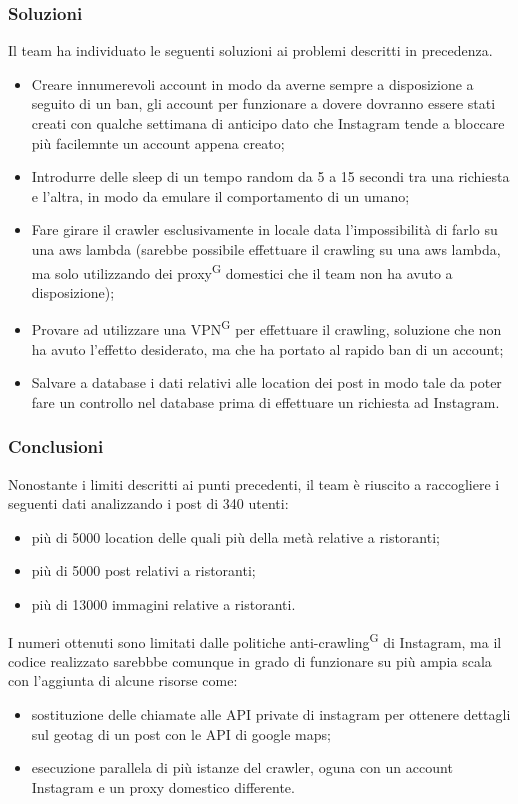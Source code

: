 \subsubsection{Soluzioni}
Il team ha individuato le seguenti soluzioni ai problemi descritti in precedenza.
\begin{itemize}
    \item Creare innumerevoli account in modo da averne sempre a disposizione a seguito di un ban, gli account per funzionare a dovere dovranno essere stati creati con qualche settimana di anticipo dato che Instagram tende a bloccare più facilemnte un account appena creato;
    \item Introdurre delle sleep di un tempo random da 5 a 15 secondi tra una richiesta e l'altra, in modo da emulare il comportamento di un umano;
    \item Fare girare il crawler esclusivamente in locale data l'impossibilità di farlo su una aws lambda (sarebbe possibile effettuare il crawling su una aws lambda, ma solo utilizzando dei proxy\textsuperscript{G} domestici che il team non ha avuto a disposizione);
    \item Provare ad utilizzare una VPN\textsuperscript{G} per effettuare il crawling, soluzione che non ha avuto l'effetto desiderato, ma che ha portato al rapido ban di un account;
    \item Salvare a database i dati relativi alle location dei post in modo tale da poter fare un controllo nel database prima di effettuare un richiesta ad Instagram.
\end{itemize}

\subsubsection{Conclusioni}
Nonostante i limiti descritti ai punti precedenti, il team è riuscito a raccogliere i seguenti dati analizzando i post di 340 utenti:
\begin{itemize}
    \item più di 5000 location delle quali più della metà relative a ristoranti;
    \item più di 5000 post relativi a ristoranti;
    \item più di 13000 immagini relative a ristoranti.
\end{itemize}
I numeri ottenuti sono limitati dalle politiche anti-crawling\textsuperscript{G} di Instagram, ma il codice realizzato sarebbbe comunque in grado di funzionare su più ampia scala con l'aggiunta di alcune risorse come:
\begin{itemize}
    \item sostituzione delle chiamate alle API private di instagram per ottenere dettagli sul geotag di un post con le API di google maps;
    \item esecuzione parallela di più istanze del crawler, oguna con un account Instagram e un proxy domestico differente.
\end{itemize}

